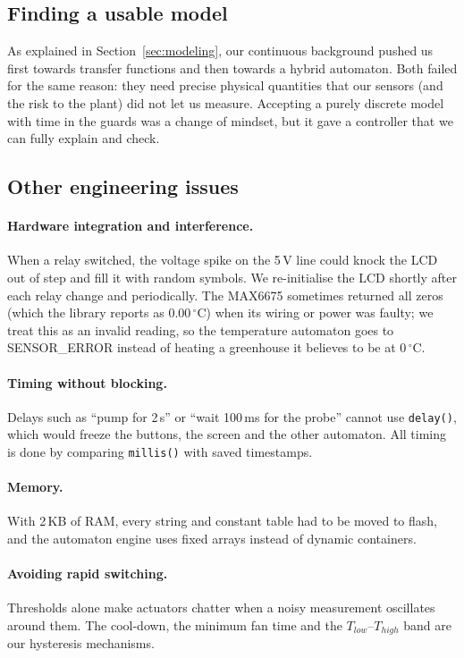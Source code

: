 \documentclass[10pt,a4paper,twocolumn]{article}
\newcommand{\code}[1]{\texttt{#1}}
\begin{document}
\subsection{Finding a usable model}
As explained in Section~\ref{sec:modeling}, our continuous background pushed us first
towards transfer functions and then towards a hybrid automaton. Both failed for the same
reason: they need precise physical quantities that our sensors (and the risk to the
plant) did not let us measure. Accepting a purely discrete model with time in the
guards was a change of mindset, but it gave a controller that we can fully explain and
check.

\subsection{Other engineering issues}
\paragraph{Hardware integration and interference.} When a relay switched, the
voltage spike on the 5\,V line could knock the LCD out of step and fill it with random
symbols. We re-initialise the LCD shortly after each relay change and periodically.
The MAX6675 sometimes returned all zeros (which the library reports as 0.00\,$^\circ$C)
when its wiring or power was faulty; we treat this as an invalid reading, so the
temperature automaton goes to SENSOR\_ERROR instead of heating a greenhouse it believes
to be at 0\,$^\circ$C.

\paragraph{Timing without blocking.} Delays such as ``pump for 2\,s'' or ``wait
100\,ms for the probe'' cannot use \code{delay()}, which would freeze the buttons, the
screen and the other automaton. All timing is done by comparing \code{millis()} with
saved timestamps.

\paragraph{Memory.} With 2\,KB of RAM, every string and constant table had to be moved
to flash, and the automaton engine uses fixed arrays instead of dynamic containers.

\paragraph{Avoiding rapid switching.} Thresholds alone make actuators chatter when a
noisy measurement oscillates around them. The cool-down, the minimum fan time and the
$T_{low}$--$T_{high}$ band are our hysteresis mechanisms.
\end{document}
